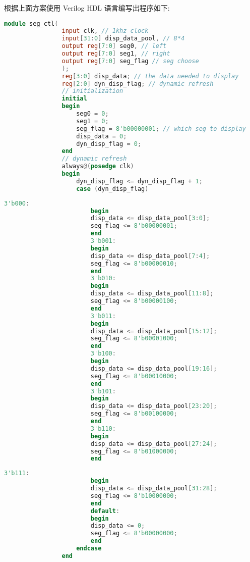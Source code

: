 {\begin{spacing}{1.5}
			根据上面方案使用 Verilog HDL 语言编写出程序如下:
			\begin{lstlisting}[language=Verilog]
			module seg_ctl(
				input clk, // 1khz clock
				input[31:0] disp_data_pool, // 8*4
				output reg[7:0] seg0, // left
				output reg[7:0] seg1, // right
				output reg[7:0] seg_flag // seg choose
				);
				reg[3:0] disp_data; // the data needed to display
				reg[2:0] dyn_disp_flag; // dynamic refresh
				// initialization
				initial
				begin
					seg0 = 0;
					seg1 = 0;
					seg_flag = 8'b00000001; // which seg to display
					disp_data = 0;
					dyn_disp_flag = 0;
				end
				// dynamic refresh
				always@(posedge clk)
				begin
					dyn_disp_flag <= dyn_disp_flag + 1;
					case (dyn_disp_flag)
			\end{lstlisting}
			\begin{lstlisting}[language=Verilog]
						3'b000:
						begin
						disp_data <= disp_data_pool[3:0];
						seg_flag <= 8'b00000001;
						end
						3'b001:
						begin
						disp_data <= disp_data_pool[7:4];
						seg_flag <= 8'b00000010;
						end
						3'b010:
						begin
						disp_data <= disp_data_pool[11:8];
						seg_flag <= 8'b00000100;
						end
						3'b011:
						begin
						disp_data <= disp_data_pool[15:12];
						seg_flag <= 8'b00001000;
						end
						3'b100:
						begin
						disp_data <= disp_data_pool[19:16];
						seg_flag <= 8'b00010000;
						end
						3'b101:
						begin
						disp_data <= disp_data_pool[23:20];
						seg_flag <= 8'b00100000;
						end
						3'b110:
						begin
						disp_data <= disp_data_pool[27:24];
						seg_flag <= 8'b01000000;
						end
			\end{lstlisting}
			\begin{lstlisting}[language=Verilog]
						3'b111:
						begin
						disp_data <= disp_data_pool[31:28];
						seg_flag <= 8'b10000000;
						end
						default:
						begin
						disp_data <= 0;
						seg_flag <= 8'b00000000;
						end
					endcase
				end
			

\end{lstlisting}
\end{spacing}}
